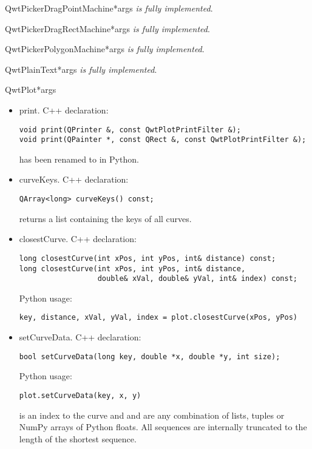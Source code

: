 \documentclass{manual}
\begin{document}
\begin{classdesc}{QwtPickerDragPointMachine}{*args}
\emph{is fully implemented}.
\end{classdesc}

\begin{classdesc}{QwtPickerDragRectMachine}{*args}
\emph{is fully implemented}.
\end{classdesc}

\begin{classdesc}{QwtPickerPolygonMachine}{*args}
\emph{is fully implemented}.
\end{classdesc}

\begin{classdesc}{QwtPlainText}{*args}
\emph{is fully implemented}.
\end{classdesc}

\begin{classdesc}{QwtPlot}{*args}

  \begin{itemize}

    \item{print}. C++ declaration:
      \begin{verbatim}
void print(QPrinter &, const QwtPlotPrintFilter &);
void print(QPainter *, const QRect &, const QwtPlotPrintFilter &);
      \end{verbatim}
       has been renamed to  in Python.

    \item{curveKeys}. C++ declaration:
      \begin{verbatim}
QArray<long> curveKeys() const;
      \end{verbatim}
       returns a list containing the keys of all curves.

    \item{closestCurve}. C++ declaration:
      \begin{verbatim}
long closestCurve(int xPos, int yPos, int& distance) const;
long closestCurve(int xPos, int yPos, int& distance,
                  double& xVal, double& yVal, int& index) const;
      \end{verbatim}
      Python usage:
      \begin{verbatim}
key, distance, xVal, yVal, index = plot.closestCurve(xPos, yPos)
      \end{verbatim}

    \item{setCurveData}. C++ declaration:
      \begin{verbatim}
bool setCurveData(long key, double *x, double *y, int size);
      \end{verbatim}
      Python usage:
      \begin{verbatim}
plot.setCurveData(key, x, y)
      \end{verbatim}
       is an index to the curve and  and  are any
      combination of lists, tuples or NumPy arrays of Python floats.
      All sequences are internally truncated to the length of the shortest
      sequence.


\end{itemize}
\end{classdesc}
\end{document}
